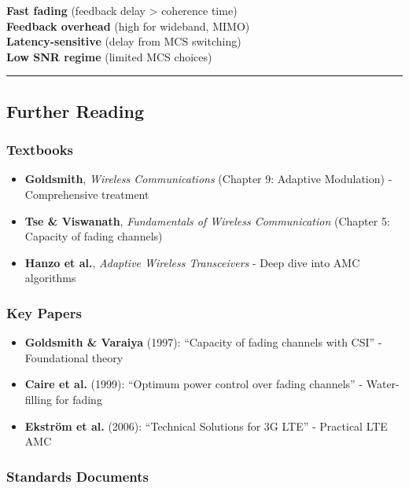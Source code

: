 \textbf{Fast fading} (feedback delay \textgreater{} coherence time)\\
\textbf{Feedback overhead} (high for wideband, MIMO)\\
\textbf{Latency-sensitive} (delay from MCS switching)\\
\textbf{Low SNR regime} (limited MCS choices)

\begin{center}\rule{0.5\linewidth}{0.5pt}\end{center}

\subsection{Further Reading}\label{further-reading}

\subsubsection{Textbooks}\label{textbooks}

\begin{itemize}
\tightlist
\item
  \textbf{Goldsmith}, \emph{Wireless Communications} (Chapter 9:
  Adaptive Modulation) - Comprehensive treatment
\item
  \textbf{Tse \& Viswanath}, \emph{Fundamentals of Wireless
  Communication} (Chapter 5: Capacity of fading channels)
\item
  \textbf{Hanzo et al.}, \emph{Adaptive Wireless Transceivers} - Deep
  dive into AMC algorithms
\end{itemize}

\subsubsection{Key Papers}\label{key-papers}

\begin{itemize}
\tightlist
\item
  \textbf{Goldsmith \& Varaiya} (1997): ``Capacity of fading channels
  with CSI'' - Foundational theory
\item
  \textbf{Caire et al.} (1999): ``Optimum power control over fading
  channels'' - Water-filling for fading
\item
  \textbf{Ekström et al.} (2006): ``Technical Solutions for 3G LTE'' -
  Practical LTE AMC
\end{itemize}

\subsubsection{Standards Documents}\label{standards-documents}

